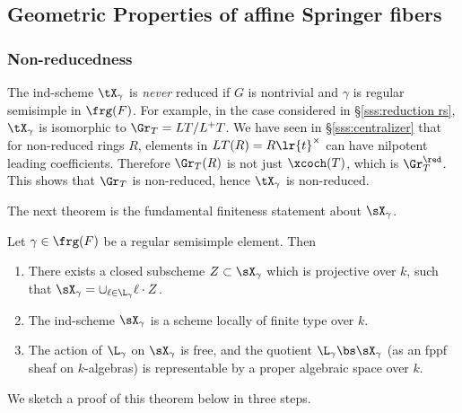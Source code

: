 \subsection{Geometric Properties of affine Springer fibers}


\subsubsection{Non-reducedness} The ind-scheme $\tX_{\gamma}$ is {\em never} reduced if $G$ is nontrivial and $\gamma$ is regular semisimple in $\frg(F)$. For example, in the case considered in \S\ref{sss:reduction rs}, $\tX_{\gamma}$ is isomorphic to $\Gr_{T}=LT/L^{+}T$. We have seen in \S\ref{sss:centralizer} that for non-reduced rings $R$, elements in $LT(R)=R\lr{t}^{\times}$ can have nilpotent leading coefficients. Therefore $\Gr_{T}(R)$ is not just $\xcoch(T)$, which is $\Gr^{\red}_{T}$. This shows that $\Gr_{T}$ is non-reduced, hence $\tX_{\gamma}$ is non-reduced. 


The next theorem is the fundamental finiteness statement about $\sX_{\gamma}$.
 
 
 
 
\begin{theorem}\label{th:ft quot} Let $\gamma\in \frg(F)$ be a regular semisimple element. Then
\begin{enumerate}
\item There exists a closed subscheme $Z\subset \sX_{\gamma}$ which is projective over $k$, such that $\sX_{\gamma}=\cup_{\ell\in\L_{\gamma}}\ell\cdot Z$.
\item The ind-scheme $\sX_{\gamma}$ is a scheme locally of finite type over $k$. 
\item The action of $\L_{\gamma}$ on $\sX_{\gamma}$ is free, and the quotient $\L_{\gamma}\bs\sX_{\gamma}$ (as an fppf sheaf on $k$-algebras) is representable by a proper algebraic space over $k$.
\end{enumerate}
\end{theorem}

We sketch a proof of this theorem below in three steps.

